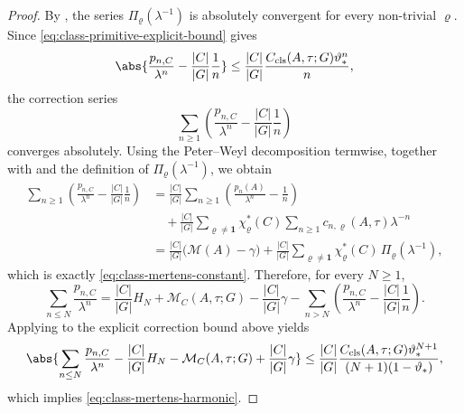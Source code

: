 \begin{proof}
  By , the series
  \(\Pi_\varrho(\lambda^{-1})\) is absolutely convergent for every
  non-trivial \(\varrho\). Since
  \eqref{eq:class-primitive-explicit-bound} gives
  \[
    \abs{
      \frac{p_{n,C}}{\lambda^n}
      -\frac{|C|}{|G|}\frac{1}{n}
    }
    \le
    \frac{|C|}{|G|}
    \frac{C_{\mathrm{cls}}(A,\tau;G)\vartheta_*^n}{n},
  \]
  the correction series
  \[
    \sum_{n\ge 1}
      \left(
        \frac{p_{n,C}}{\lambda^n}
        -\frac{|C|}{|G|}\frac{1}{n}
      \right)
  \]
  converges absolutely. Using the Peter--Weyl decomposition termwise,
  together with  and the definition of
  \(\Pi_\varrho(\lambda^{-1})\), we obtain
  \begin{align*}
    \sum_{n\ge 1}
      \left(
        \frac{p_{n,C}}{\lambda^n}
        -\frac{|C|}{|G|}\frac{1}{n}
      \right)
    &=
    \frac{|C|}{|G|}
      \sum_{n\ge 1}
        \left(
          \frac{p_n(A)}{\lambda^n}-\frac{1}{n}
        \right) \\
    &\quad
    +
    \frac{|C|}{|G|}
      \sum_{\varrho\neq\mathbf 1}
        \chi_\varrho^\ast(C)
        \sum_{n\ge 1}c_{n,\varrho}(A,\tau)\lambda^{-n} \\
    &=
    \frac{|C|}{|G|}\bigl(\mathcal M(A)-\gamma\bigr)
    +\frac{|C|}{|G|}
      \sum_{\varrho\neq\mathbf 1}
        \chi_\varrho^\ast(C)\,\Pi_\varrho(\lambda^{-1}),
  \end{align*}
  which is exactly
  \eqref{eq:class-mertens-constant}. Therefore, for every \(N\ge 1\),
  \[
    \sum_{n\le N}\frac{p_{n,C}}{\lambda^n}
    =
    \frac{|C|}{|G|}H_N
    +\mathcal M_C(A,\tau;G)-\frac{|C|}{|G|}\gamma
    -\sum_{n>N}
      \left(
        \frac{p_{n,C}}{\lambda^n}
        -\frac{|C|}{|G|}\frac{1}{n}
      \right).
  \]
  Applying  to the explicit
  correction bound above yields
  \[
    \abs{
      \sum_{n\le N}\frac{p_{n,C}}{\lambda^n}
      -\frac{|C|}{|G|}H_N
      -\mathcal M_C(A,\tau;G)+\frac{|C|}{|G|}\gamma
    }
    \le
    \frac{|C|}{|G|}
    \frac{
      C_{\mathrm{cls}}(A,\tau;G)\vartheta_*^{N+1}
    }{
      (N+1)(1-\vartheta_*)
    },
  \]
  which implies \eqref{eq:class-mertens-harmonic}.
\end{proof}

